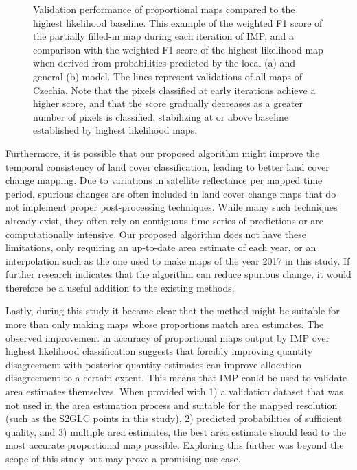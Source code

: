 \begin{figure}
\begin{subfigure}[b]{0.75\textwidth}
        \end{subfigure}
            \vspace*{-0.75cm}
            \caption{Validation performance of proportional maps compared to the highest likelihood baseline. This example of the weighted F1 score of the partially filled-in map during each iteration of IMP, and a comparison with the weighted F1-score of the highest likelihood map when derived from probabilities predicted by the local (a) and general (b) model. The lines represent validations of all maps of Czechia. Note that the pixels classified at early iterations achieve a higher score, and that the score gradually decreases as a greater number of pixels is classified, stabilizing at or above baseline established by highest likelihood maps.}
            \label{fig:f1_score_during_filling}
        \end{figure}
    
        Furthermore, it is possible that our proposed algorithm might improve the temporal consistency of land cover classification, leading to better land cover change mapping. Due to variations in satellite reflectance per mapped time period, spurious changes are often included in land cover change maps that do not implement proper post-processing techniques. While many such techniques already exist, they often rely on contiguous time series of predictions or are computationally intensive. Our proposed algorithm does not have these limitations, only requiring an up-to-date area estimate of each year, or an interpolation such as the one used to make maps of the year 2017 in this study. If further research indicates that the algorithm can reduce spurious change, it would therefore be a useful addition to the existing methods.
        
        Lastly, during this study it became clear that the method might be suitable for more than only making maps whose proportions match area estimates. The observed improvement in accuracy of proportional maps output by IMP over highest likelihood classification suggests that forcibly improving quantity disagreement with posterior quantity estimates can improve allocation disagreement to a certain extent. This means that IMP could be used to validate area estimates themselves. When provided with 1) a validation dataset that was not used in the area estimation process and suitable for the mapped resolution (such as the S2GLC points in this study), 2) predicted probabilities of sufficient quality, and 3) multiple area estimates, the best area estimate should lead to the most accurate proportional map possible. Exploring this further was beyond the scope of this study but may prove a promising use case.

